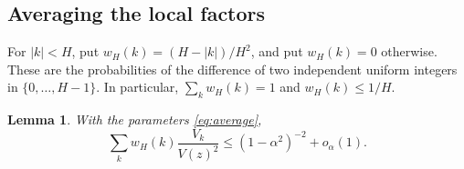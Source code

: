 \documentclass[11pt,reqno]{amsart}
\newtheorem{lemma}[theorem]{Lemma}
\theoremstyle{remark}
\numberwithin{equation}{section}
\begin{document}
\subsection{Averaging the local factors}

For $|k|<H$, put $w_H(k)=(H-|k|)/H^2$, and put $w_H(k)=0$
otherwise. These are the probabilities of the difference of two
independent uniform integers in $\{0,\ldots,H-1\}$.
In particular, $\sum_kw_H(k)=1$ and $w_H(k)\leq1/H$.

\begin{lemma}\label{lem:localmean}
With the parameters \eqref{eq:average},
\begin{equation}\label{eq:localmean}
 \sum_kw_H(k)\frac{V_k}{V(z)^2}
 \leq(1-\alpha^2)^{-2}+o_\alpha(1).
\end{equation}
\end{lemma}
\end{document}
